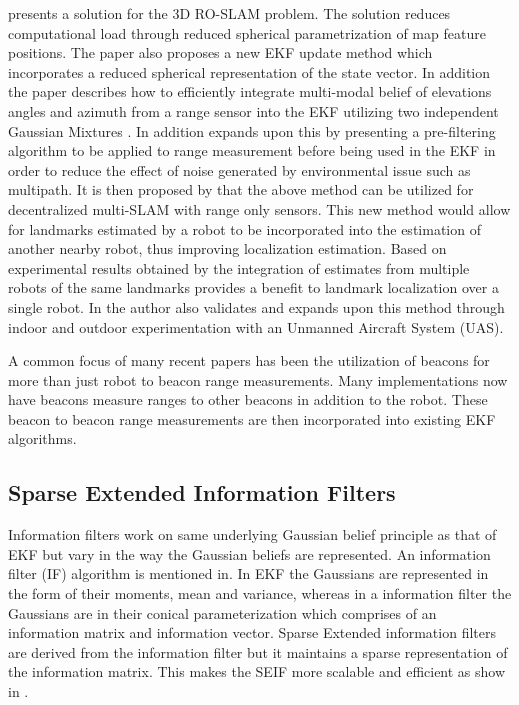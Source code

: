 \documentclass[conference]{IEEEtran}
\begin{document}
	\cite{Fabresse2013} presents a solution for the 3D RO-SLAM problem. The solution reduces computational load through reduced spherical parametrization of map feature positions. The paper also proposes a new EKF update method which incorporates a reduced spherical representation of the state vector. In addition the paper describes how to efficiently integrate multi-modal belief of elevations angles and azimuth from a range sensor into the EKF utilizing two independent Gaussian Mixtures \cite{Fabresse2013}. In addition \cite{Fabresse2014} expands upon this by presenting a pre-filtering algorithm to be applied to range measurement before being used in the EKF in order to reduce the effect of noise generated by environmental issue such as multipath. It is then proposed by \cite{Fabresse2015} that the above method can be utilized for decentralized multi-SLAM with range only sensors. This new method would allow for landmarks estimated by a robot to be incorporated into the estimation of another nearby robot, thus improving localization estimation. Based on experimental results obtained by \cite{Fabresse2015} the integration of estimates from multiple robots of the same landmarks provides a benefit to landmark localization over a single robot. In \cite{Fabresse2016} the author also validates and expands upon this method through indoor and outdoor experimentation with an Unmanned Aircraft System (UAS).  
	
	
	A common focus of many recent papers has been the utilization of beacons for more than just robot to beacon range measurements. Many implementations now have beacons measure ranges to other beacons in addition to the robot. These beacon to beacon range measurements are then incorporated into existing EKF algorithms.
	
\subsection{Sparse Extended Information Filters}

Information filters work on same underlying Gaussian belief principle as that of EKF but vary in the way the Gaussian beliefs are represented. An information filter (IF) algorithm is mentioned in\cite{Torres-Gonzalez2014}. In EKF the Gaussians are represented in the form of their moments, mean and variance, whereas in a information filter the Gaussians are in their conical parameterization which comprises of an information matrix and information vector. 
Sparse Extended information filters are derived from the  information filter but it maintains a sparse representation of the information matrix. This makes the SEIF more scalable and efficient as show in \cite{Torres-Gonzalez2014}.
\end{document}
